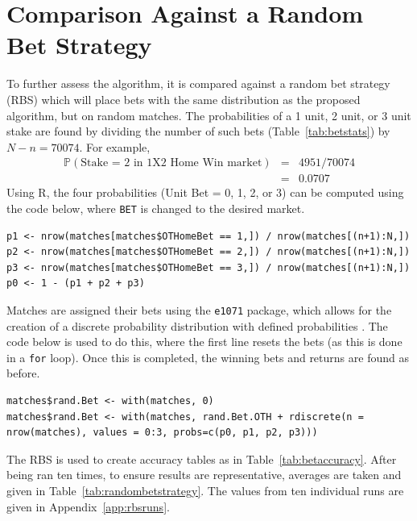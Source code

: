 \documentclass[a4paper,10pt]{report}
\begin{document}
\section{Comparison Against a Random Bet Strategy}\label{sec:modelcomp}
To further assess the algorithm, it is compared against a random bet strategy (RBS) which will place bets with the same distribution as the proposed algorithm, but on random matches. The probabilities of a 1 unit, 2 unit, or 3 unit stake are found by dividing the number of such bets (Table~\ref{tab:betstats}) by $N-n = 70074$. For example,
$$\begin{array}{rcl}
\mathbb{P}(\textrm{Stake = 2 in 1X2 Home Win market})& = &{4951} / {70074} \\  & = &0.0707
\end{array}
$$
Using R, the four probabilities (Unit Bet = 0, 1, 2, or 3) can be computed using the code below, where \lstinline|BET| is changed to the desired market. 
\begin{lstlisting}
p1 <- nrow(matches[matches$OTHomeBet == 1,]) / nrow(matches[(n+1):N,])
p2 <- nrow(matches[matches$OTHomeBet == 2,]) / nrow(matches[(n+1):N,])
p3 <- nrow(matches[matches$OTHomeBet == 3,]) / nrow(matches[(n+1):N,])
p0 <- 1 - (p1 + p2 + p3)
\end{lstlisting}
Matches are assigned their bets using the \lstinline|e1071| package, which allows for the creation of a discrete probability distribution with defined probabilities \autocite{e1071Package}. The code below is used to do this, where the first line resets the bets (as this is done in a \lstinline|for| loop). Once this is completed, the winning bets and returns are found as before. 
\begin{lstlisting}
matches$rand.Bet <- with(matches, 0)
matches$rand.Bet <- with(matches, rand.Bet.OTH + rdiscrete(n = nrow(matches), values = 0:3, probs=c(p0, p1, p2, p3)))
\end{lstlisting}

The RBS is used to create accuracy tables as in Table~\ref{tab:betaccuracy}. After being ran ten times, to ensure results are representative, averages are taken and given in Table~\ref{tab:randombetstrategy}. The values from ten individual runs are given in Appendix~\ref{app:rbsruns}.
\end{document}
